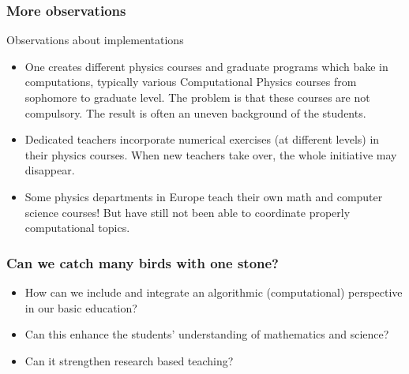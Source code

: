 \documentclass{beamer}
\begin{document}
\begin{frame}
\frametitle{More observations}

\begin{block}{Observations about implementations }

\begin{itemize}
\item One creates different physics courses and graduate programs which bake in computations, typically various Computational Physics courses from sophomore to graduate level.  The problem is that these courses are not compulsory. The result is often an uneven background of the students. 

\item Dedicated teachers incorporate numerical exercises (at different levels) in their physics courses. When new teachers take over, the whole initiative may disappear. 

\item Some  physics departments in Europe teach their own math and computer science courses! But have still not been able to coordinate properly computational topics.
\end{itemize}

\noindent
\end{block}
\end{frame}

\begin{frame}
\frametitle{Can we catch many birds with one stone?}

\begin{block}{}
\begin{itemize}
\item How can we include and integrate an algorithmic (computational) perspective   in our basic education?

\item Can this enhance the students' understanding of mathematics and science?

\item Can it strengthen research based teaching?
\end{itemize}

\noindent
\end{block}
\end{frame}
\end{document}

